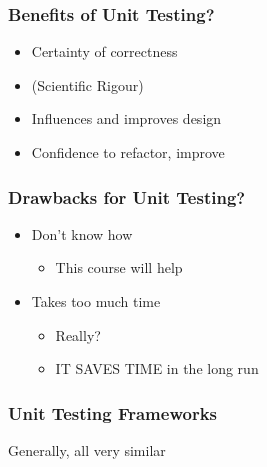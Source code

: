 \hypertarget{benefits-of-unit-testing}{%
\subsubsection{Benefits of Unit
Testing?}\label{benefits-of-unit-testing}}

\begin{itemize}
\tightlist
\item
  Certainty of correctness
\item
  (Scientific Rigour)
\item
  Influences and improves design
\item
  Confidence to refactor, improve
\end{itemize}

\hypertarget{drawbacks-for-unit-testing}{%
\subsubsection{Drawbacks for Unit
Testing?}\label{drawbacks-for-unit-testing}}

\begin{itemize}
\tightlist
\item
  Don't know how

  \begin{itemize}
  \tightlist
  \item
    This course will help
  \end{itemize}
\item
  Takes too much time

  \begin{itemize}
  \tightlist
  \item
    Really?
  \item
    IT SAVES TIME in the long run
  \end{itemize}
\end{itemize}

\hypertarget{unit-testing-frameworks}{%
\subsubsection{Unit Testing Frameworks}\label{unit-testing-frameworks}}

Generally, all very similar

